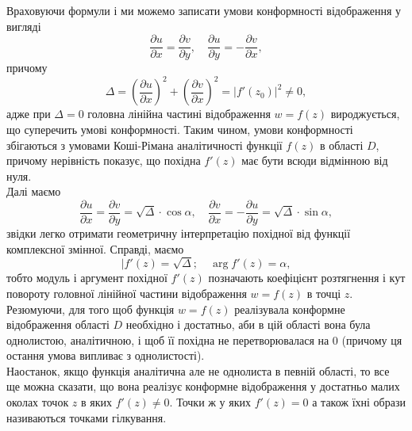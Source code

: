 Враховуючи формули  і  ми можемо записати умови конформності відображення  у вигляді
\begin{equation}
    \label{eq:27.16}
    \dfrac{\partial u}{\partial x} = \dfrac{\partial v}{\partial y}, \quad \dfrac{\partial u}{\partial y} = - \dfrac{\partial v}{\partial x},
\end{equation}
причому
\begin{equation}
    \label{eq:27.17}
    \Delta = \left( \dfrac{\partial u}{\partial x} \right)^2 + \left( \dfrac{\partial v}{\partial x} \right)^2 = |f'(z_0)|^2 \ne 0,
\end{equation}
адже при $\Delta = 0$ головна лінійна частині відображення $w = f(z)$ вироджується, що суперечить умові конформності. Таким чином, умови конформності збігаються з умовами Коші-Рімана аналітичності функції $f(z)$ в області $D$, причому нерівність  показує, що похідна $f'(z)$ має бути всюди відмінною від нуля. \\

Далі маємо 
\begin{equation*}
    \dfrac{\partial u}{\partial x} = \dfrac{\partial v}{\partial y} = \sqrt{\Delta} \cdot \cos \alpha, \quad \dfrac{\partial v}{\partial x} = - \dfrac{\partial u}{\partial y} = \sqrt{\Delta} \cdot \sin \alpha,
\end{equation*}
звідки легко отримати геометричну інтерпретацію похідної від функції комплексної змінної. Справді, маємо
\begin{equation}
    \label{eq:27.18}
    |f'(z) = \sqrt{\Delta}; \quad \arg f'(z) = \alpha,
\end{equation}
тобто модуль і аргумент похідної $f'(z)$ позначають коефіцієнт розтягнення і кут повороту головної лінійної частини відображення $w = f(z)$ в точці $z$. \\

Резюмуючи, для того щоб функція $w = f(z)$ реалізувала конформне відображення області $D$ необхідно і достатньо, аби в цій області вона була однолистою, аналітичною, і щоб її похідна не перетворювалася на 0 (причому ця остання умова випливає з однолистості). \\

Наостанок, якщо функція аналітична але не однолиста в певній області, то все ще можна сказати, що вона реалізує конформне відображення у достатньо малих околах точок $z$ в яких $f'(z) \ne 0$. Точки ж у яких $f'(z) = 0$ а також їхні образи називаються точками гілкування.

